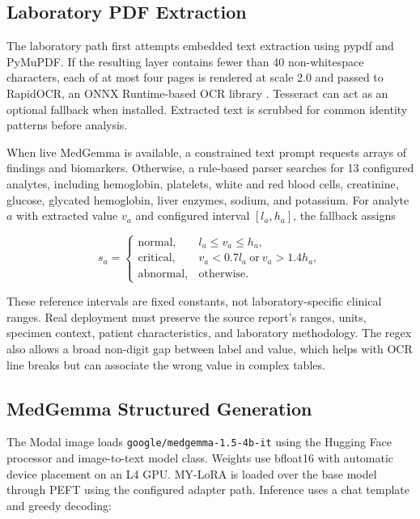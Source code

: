 \documentclass[conference]{IEEEtran}
\begin{document}
\subsection{Laboratory PDF Extraction}

The laboratory path first attempts embedded text extraction using pypdf and PyMuPDF. If the resulting layer contains fewer than 40 non-whitespace characters, each of at most four pages is rendered at scale 2.0 and passed to RapidOCR, an ONNX Runtime-based OCR library \cite{rapidocr}. Tesseract can act as an optional fallback when installed. Extracted text is scrubbed for common identity patterns before analysis.

When live MedGemma is available, a constrained text prompt requests arrays of findings and biomarkers. Otherwise, a rule-based parser searches for 13 configured analytes, including hemoglobin, platelets, white and red blood cells, creatinine, glucose, glycated hemoglobin, liver enzymes, sodium, and potassium. For analyte \(a\) with extracted value \(v_a\) and configured interval \([l_a,h_a]\), the fallback assigns

\begin{equation}
s_a=
\begin{cases}
\mathrm{normal}, & l_a\le v_a\le h_a,\\
\mathrm{critical}, & v_a<0.7l_a\ \mathrm{or}\ v_a>1.4h_a,\\
\mathrm{abnormal}, & \mathrm{otherwise}.
\end{cases}
\end{equation}

These reference intervals are fixed constants, not laboratory-specific clinical ranges. Real deployment must preserve the source report's ranges, units, specimen context, patient characteristics, and laboratory methodology. The regex also allows a broad non-digit gap between label and value, which helps with OCR line breaks but can associate the wrong value in complex tables.

\subsection{MedGemma Structured Generation}

The Modal image loads \texttt{google/medgemma-1.5-4b-it} using the Hugging Face processor and image-to-text model class. Weights use bfloat16 with automatic device placement on an L4 GPU. MY-LoRA is loaded over the base model through PEFT using the configured adapter path. Inference uses a chat template and greedy decoding:
\end{document}
